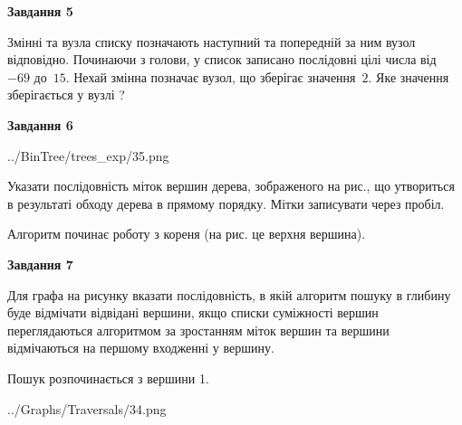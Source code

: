 \documentclass[12pt, ukrainian]{article}
\begin{document}
{\begin {large}
{\begin {center}\textbf{Завдання 5}\end {center}}\par
Змінні  та  вузла списку позначають наступний та попередній за ним вузол відповідно. Починаючи з голови, у список записано послідовні цілі числа від~$-69$ до~$15$. Нехай змінна  позначає вузол, що зберігає значення~$2$.
Яке значення зберігається у вузлі  ?\par
\newpage

{\begin {center}\textbf{Завдання 6}\end {center}}\par

\begin{center}
	{../BinTree/trees_exp/35.png}
\end{center}
Указати послідовність міток вершин дерева, зображеного на рис., що утвориться в результаті обходу дерева в прямому порядку. Мітки записувати через пробіл.\par Алгоритм починає роботу з кореня (на рис. це верхня вершина).\par
\newpage

{\begin {center}\textbf{Завдання 7}\end {center}}\par
Для графа на рисунку вказати послідовність, в якій алгоритм пошуку в глибину буде відмічати відвідані вершини, якщо списки суміжності вершин переглядаються алгоритмом за зростанням міток вершин та вершини відмічаються на першому вход\-женні у вершину.\par
Пошук розпочинається з вершини 1.\par

\begin{center}
	{../Graphs/Traversals/34.png}
\end{center}\par
\newpage


\end{large}}
\end{document}
